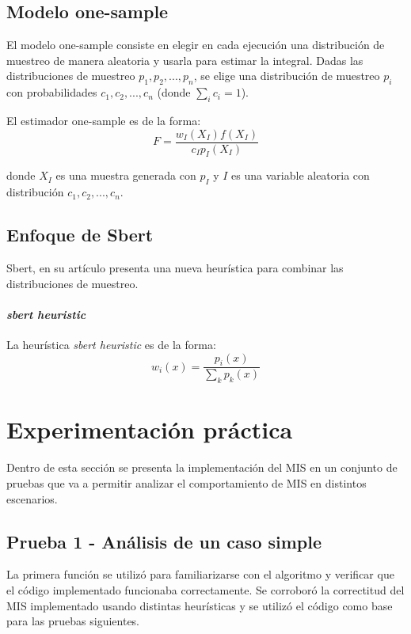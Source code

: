 \documentclass{article}
\begin{document}
\subsection{Modelo one-sample}

El modelo one-sample consiste en elegir en cada ejecución una distribución de muestreo de manera aleatoria y usarla para estimar la integral.
Dadas las distribuciones de muestreo $p_{1}, p_{2}, ..., p_{n}$, se elige una distribución de muestreo $p_{i}$ con probabilidades $c_{1}, c_{2}, ..., c_{n}$ (donde $\sum_{i} c_{i} = 1$).

El estimador one-sample es de la forma:
$$F = \frac{w_{I}(X_{I}) f(X_{I})}{c_{I} p_{I}(X_{I})}$$

donde $X_{I}$ es una muestra generada con $p_{I}$ y $I$ es una variable aleatoria con distribución $c_{1}, c_{2}, ..., c_{n}$.

\subsection{Enfoque de Sbert}

Sbert, en su artículo \cite{Sbert2016} presenta una nueva heurística para combinar las distribuciones de muestreo.

\paragraph{\textit{sbert heuristic}} La heurística \textit{sbert heuristic} es de la forma:
$$ w_{i}(x) = \frac{p_{i}(x)}{\sum_{k} p_{k}(x)}$$

\section{Experimentación práctica}

Dentro de esta sección se presenta la implementación del MIS en un conjunto de pruebas que va a permitir analizar el comportamiento de MIS en distintos escenarios.

\subsection{Prueba 1 - Análisis de un caso simple}

La primera función se utilizó para familiarizarse con el algoritmo y verificar que el código implementado funcionaba correctamente.
Se corroboró la correctitud del MIS implementado usando distintas heurísticas y se utilizó el código como base para las pruebas siguientes.
\end{document}

